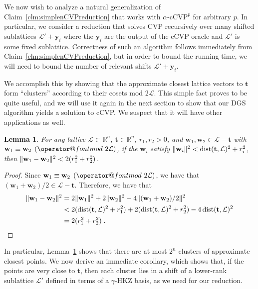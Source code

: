\documentclass[11pt]{article}
\makeatletter
\newtheorem{lemma}[theorem]{Lemma}
\newcommand{\R}{\ensuremath{\mathbb{R}}}
\renewcommand{\vec}[1]{\ensuremath{\mathbf{#1}}}
\newcommand{\problem}[1]{\mbox{#1}\xspace}
\newcommand{\scarequotes}[1]{``#1''}
\def\imod#1{\allowbreak\mkern8mu({\operator@font mod}\,\,#1)}
\newcommand{\lat}{\mathcal{L}}
\DeclareMathOperator{\dist}{dist}
\DeclarePairedDelimiter\length{\lVert}{\rVert}
\makeatother
\begin{document}
\label{sec:clusters} 

We now wish to analyze a natural generalization of Claim~\ref{clm:simplenCVPreduction} that works with $\alpha\text{-}\problem{cCVP}^p$ for arbitrary $p$. In particular, we consider a reduction that solves \problem{CVP} recursively over many shifted sublattices $\lat' + \vec{y}_i$ where the $\vec{y}_i$ are the output of the cCVP oracle and $\lat'$ is some fixed sublattice. Correctness of such an algorithm follows immediately from Claim~\ref{clm:simplenCVPreduction}, but in order to bound the running time, we will need to bound the number of relevant shifts $\lat' + \vec{y}_i$. 

We accomplish this by showing that the approximate closest lattice vectors to $\vec{t}$ form \scarequotes{clusters} according to their cosets mod $2\lat$. This simple fact proves to be quite useful, and we will use it again in the next section to show that our DGS algorithm yields a solution to cCVP. We suspect that it will have other applications as well.

\begin{lemma}
\label{lem:clusters}
For any lattice $\lat \subset \R^n $, $\vec{t} \in \R^n$, $r_1,r_2 > 0$, and
$\vec{w}_1, \vec{w}_2 \in \lat-\vec{t}$ with $\vec{w}_1 \equiv \vec{w}_2
\imod{2\lat}$, if the $\vec{w}_i$ satisfy $\length{\vec{w}_i}^2 < \dist(\vec{t}, \lat)^2 + r_i^2$, then 
$\length{\vec{w}_1 - \vec{w}_2}^2 < 2(r_1^2+r_2^2)$.
\end{lemma}
\begin{proof}
Since $\vec{w}_1 \equiv \vec{w}_2 \imod{2\lat}$, we have that $(\vec{w}_1 +
\vec{w}_2)/2 \in \lat-\vec{t}$. Therefore, we have that
\begin{align*}
\|\vec{w}_1-\vec{w}_2\|^2 
   &= 2\|\vec{w}_1\|^2 + 2\|\vec{w}_2\|^2 - 4\|(\vec{w}_1+\vec{w}_2)/2\|^2 \\
   &< 2(\dist(\vec{t}, \lat)^2+r_1^2) + 2(\dist(\vec{t}, \lat)^2+r_2^2) - 4 \dist(\vec{t}, \lat)^2 \\
   &= 2(r_1^2+r_2^2) \; . \qedhere
\end{align*}
\end{proof}

In particular, Lemma~\ref{lem:clusters} shows that there are at most $2^n$ clusters of approximate closest points. We now derive an immediate corollary, which shows that, if the points are very close to $\vec{t}$, then each cluster lies in a shift of a lower-rank sublattice $\lat'$ defined in terms of a $\gamma$-HKZ basis, as we need for our reduction.
\end{document}
